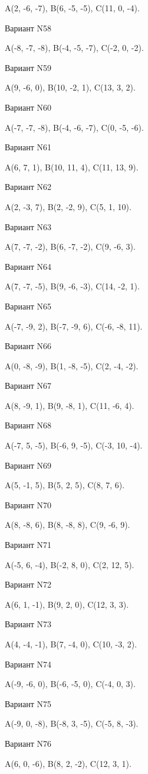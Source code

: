 \documentclass[11pt]{report}
\begin{document}
A(2, -6, -7), B(6, -5, -5), C(11, 0, -4).

Вариант N58

A(-8, -7, -8), B(-4, -5, -7), C(-2, 0, -2).

Вариант N59

A(9, -6, 0), B(10, -2, 1), C(13, 3, 2).

Вариант N60

A(-7, -7, -8), B(-4, -6, -7), C(0, -5, -6).

Вариант N61

A(6, 7, 1), B(10, 11, 4), C(11, 13, 9).

Вариант N62

A(2, -3, 7), B(2, -2, 9), C(5, 1, 10).

Вариант N63

A(7, -7, -2), B(6, -7, -2), C(9, -6, 3).

Вариант N64

A(7, -7, -5), B(9, -6, -3), C(14, -2, 1).

Вариант N65

A(-7, -9, 2), B(-7, -9, 6), C(-6, -8, 11).

Вариант N66

A(0, -8, -9), B(1, -8, -5), C(2, -4, -2).

Вариант N67

A(8, -9, 1), B(9, -8, 1), C(11, -6, 4).

Вариант N68

A(-7, 5, -5), B(-6, 9, -5), C(-3, 10, -4).

Вариант N69

A(5, -1, 5), B(5, 2, 5), C(8, 7, 6).

Вариант N70

A(8, -8, 6), B(8, -8, 8), C(9, -6, 9).

Вариант N71

A(-5, 6, -4), B(-2, 8, 0), C(2, 12, 5).

Вариант N72

A(6, 1, -1), B(9, 2, 0), C(12, 3, 3).

Вариант N73

A(4, -4, -1), B(7, -4, 0), C(10, -3, 2).

Вариант N74

A(-9, -6, 0), B(-6, -5, 0), C(-4, 0, 3).

Вариант N75

A(-9, 0, -8), B(-8, 3, -5), C(-5, 8, -3).

Вариант N76

A(6, 0, -6), B(8, 2, -2), C(12, 3, 1).
\end{document}
